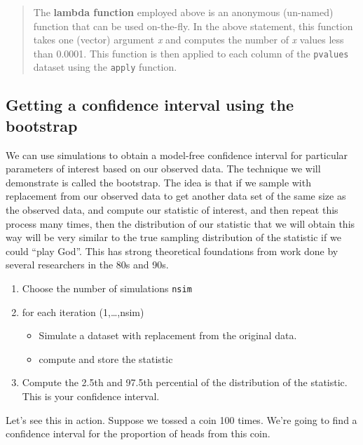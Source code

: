 \documentclass[
  letterpaper,
]{scrbook}
\providecommand{\tightlist}{%
  \setlength{\itemsep}{0pt}\setlength{\parskip}{0pt}}
\begin{document}
\begin{quote}
The \textbf{lambda function} employed above is an anonymous (un-named) function that
can be used on-the-fly. In the above statement, this function takes one (vector) argument \emph{x} and computes the number of \emph{x} values less than 0.0001. This function is then applied to each column of the \texttt{pvalues} dataset using the \texttt{apply} function.
\end{quote}

\hypertarget{getting-a-confidence-interval-using-the-bootstrap}{%
\subsection{Getting a confidence interval using the bootstrap}\label{getting-a-confidence-interval-using-the-bootstrap}}

We can use simulations to obtain a model-free confidence interval for particular parameters of interest based on our observed data. The technique we will demonstrate is called the bootstrap. The idea is that if we sample with replacement from our observed data to get another data set of the same size as the observed data, and compute our statistic of interest, and then repeat this process many times, then the distribution of our statistic that we will obtain this way will be very similar to the true sampling distribution of the statistic if we could ``play God''. This has strong theoretical foundations from work done by several researchers in the 80s and 90s.

\begin{enumerate}
\def\labelenumi{\arabic{enumi}.}
\tightlist
\item
  Choose the number of simulations \texttt{nsim}
\item
  for each iteration (1,\ldots,nsim)

  \begin{itemize}
  \tightlist
  \item
    Simulate a dataset with replacement from the original data.
  \item
    compute and store the statistic
  \end{itemize}
\item
  Compute the 2.5th and 97.5th percential of the distribution of the statistic. This is your confidence interval.
\end{enumerate}

Let's see this in action. Suppose we tossed a coin 100 times. We're going to find a confidence interval for the proportion of heads from this coin.
\end{document}
